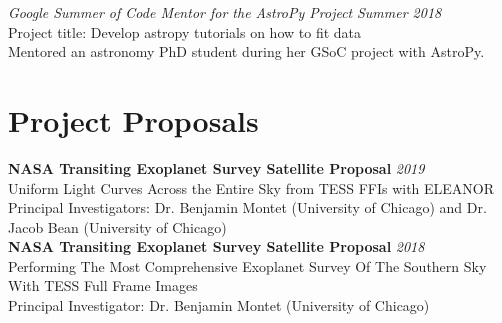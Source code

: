 \documentclass[10pt]{article}
\begin{document}
\begin{titlepage}
\emph{Google Summer of Code Mentor for the AstroPy Project} \hfill \textit{Summer 2018}
\\Project title: Develop astropy tutorials on how to fit data
\\ {\small Mentored an astronomy PhD student during her GSoC project with AstroPy.}


\section*{Project Proposals}
    \textbf{NASA Transiting Exoplanet Survey Satellite Proposal}
    \hfill \textit{2019}\\
    Uniform Light Curves Across the Entire Sky from TESS FFIs with ELEANOR\\
    {\small Principal Investigators: Dr. Benjamin Montet (University of Chicago) and Dr. Jacob Bean (University of Chicago)}\\

    \textbf{NASA Transiting Exoplanet Survey Satellite Proposal}
    \hfill \textit{2018}\\
    Performing The Most Comprehensive Exoplanet Survey Of The Southern Sky With TESS Full Frame Images\\
    {\small Principal Investigator: Dr. Benjamin Montet (University of Chicago)}


\end{titlepage}
\end{document}
